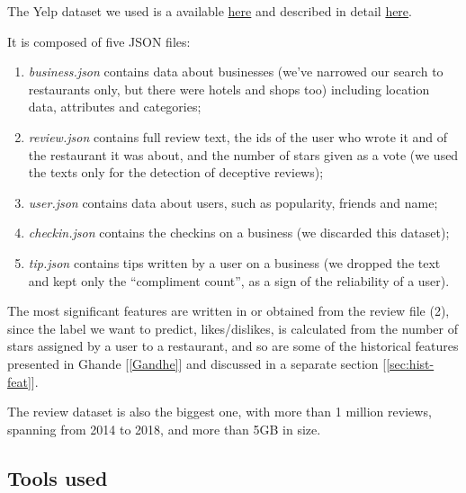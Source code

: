 The Yelp dataset we used is a available \href{https://www.kaggle.com/yelp-dataset/yelp-dataset}{here} and described in detail \href{https://www.yelp.com/dataset/documentation/main}{here}.

It is composed of five JSON files:
\begin{enumerate}
	\item \textit{business.json} contains data about businesses (we've narrowed our search to restaurants only, but there were hotels and shops too) including location data, attributes and categories;
	\item \textit{review.json} contains full review text, the ids of the user who wrote it and of the restaurant it was about, and the number of stars given as a vote (we used the texts only for the detection of deceptive reviews);
	\item \textit{user.json} contains data about users, such as popularity, friends and name;
	\item \textit{checkin.json} contains the checkins on a business (we discarded this dataset);
	\item \textit{tip.json} contains tips written by a user on a business (we dropped the text and kept only the ``compliment count'', as a sign of the reliability of a user).
\end{enumerate}

The most significant features are written in or obtained from the review file (2), since the label we want to predict, likes/dislikes, is calculated from the number of stars assigned by a user to a restaurant, and so are some of the historical features presented in Ghande [\ref{Gandhe}] and discussed in a separate section [\ref{sec:hist-feat}].

The review dataset is also the biggest one, with more than 1 million reviews, spanning from 2014 to 2018, and more than 5GB in size.

\subsection{Tools used} \label{sec:tools}

